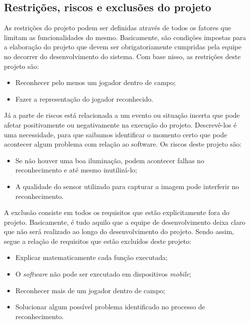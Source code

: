 \subsection{Restrições, riscos e exclusões do projeto}

As restrições do projeto podem ser definidas através de todos os fatores que limitam as funcionalidades do mesmo. Basicamente, são condições impostas para a elaboração do projeto que devem ser obrigatoriamente cumpridas pela equipe no decorrer do desenvolvimento do sistema. Com base nisso, as restrições deste projeto são:

\begin{itemize}
\raggedright \item Reconhecer pelo menos um jogador dentro de campo;
\raggedright \item Fazer a representação do jogador reconhecido.
\end{itemize}

Já a parte de riscos está relacionada a um evento ou situação incerta que pode afetar positivamente ou negativamente na execução do projeto. Descrevê-los é uma necessidade, para que saibamos identificar o momento certo que pode acontecer algum problema com relação ao software. Os riscos deste projeto são:

\begin{itemize}
\raggedright \item Se não houver uma boa iluminação, podem acontecer falhas no reconhecimento e até mesmo inutilizá-lo;
\raggedright \item A qualidade do sensor utilizado para capturar a imagem pode interferir no reconhecimento.
\end{itemize}

A exclusão consiste em todos os requisitos que estão explicitamente fora do projeto. Basicamente, é tudo aquilo que a equipe de desenvolvimento deixa claro que não será realizado ao longo do desenvolvimento do projeto. Sendo assim, segue a relação de requisitos que estão excluídos deste projeto:

\begin{itemize}
\raggedright \item Explicar matematicamente cada função executada;

\raggedright \item O \textit{software} não pode ser executado em dispositivos \textit{mobile};

\raggedright \item Reconhecer mais de um jogador dentro de campo;

\raggedright \item Solucionar algum possível problema identificado no processo de reconhecimento.
\end{itemize}